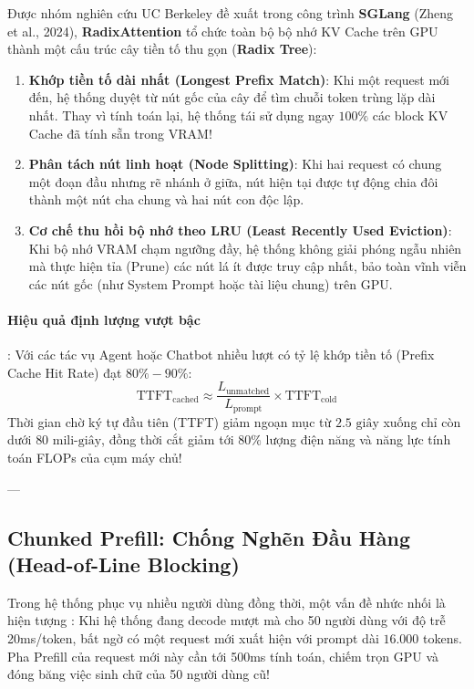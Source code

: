 Được nhóm nghiên cứu UC Berkeley đề xuất trong công trình \textbf{SGLang} (Zheng et al., 2024), \textbf{RadixAttention} tổ chức toàn bộ bộ nhớ KV Cache trên GPU thành một cấu trúc cây tiền tố thu gọn (\textbf{Radix Tree}):
\begin{enumerate}
  \item \textbf{Khớp tiền tố dài nhất (Longest Prefix Match)}: Khi một request mới đến, hệ thống duyệt từ nút gốc của cây để tìm chuỗi token trùng lặp dài nhất. Thay vì tính toán lại, hệ thống tái sử dụng ngay $100\%$ các block KV Cache đã tính sẵn trong VRAM!
  \item \textbf{Phân tách nút linh hoạt (Node Splitting)}: Khi hai request có chung một đoạn đầu nhưng rẽ nhánh ở giữa, nút hiện tại được tự động chia đôi thành một nút cha chung và hai nút con độc lập.
  \item \textbf{Cơ chế thu hồi bộ nhớ theo LRU (Least Recently Used Eviction)}: Khi bộ nhớ VRAM chạm ngưỡng đầy, hệ thống không giải phóng ngẫu nhiên mà thực hiện tỉa (Prune) các nút lá ít được truy cập nhất, bảo toàn vĩnh viễn các nút gốc (như System Prompt hoặc tài liệu chung) trên GPU.
\end{enumerate}

\paragraph{Hiệu quả định lượng vượt bậc}:
Với các tác vụ Agent hoặc Chatbot nhiều lượt có tỷ lệ khớp tiền tố (Prefix Cache Hit Rate) đạt $80\% - 90\%$:
\begin{equation}
\text{TTFT}_{\text{cached}} \approx \frac{L_{\text{unmatched}}}{L_{\text{prompt}}} \times \text{TTFT}_{\text{cold}}
\end{equation}
Thời gian chờ ký tự đầu tiên (TTFT) giảm ngoạn mục từ $2.5\text{ giây}$ xuống chỉ còn dưới \textbf{$80\text{ mili-giây}$}, đồng thời cắt giảm tới $80\%$ lượng điện năng và năng lực tính toán FLOPs của cụm máy chủ!

---

\subsection{Chunked Prefill: Chống Nghẽn Đầu Hàng (Head-of-Line Blocking)}
Trong hệ thống phục vụ nhiều người dùng đồng thời, một vấn đề nhức nhối là hiện tượng :
Khi hệ thống đang decode mượt mà cho 50 người dùng với độ trễ 20ms/token, bất ngờ có một request mới xuất hiện với prompt dài $16.000$ tokens. Pha Prefill của request mới này cần tới 500ms tính toán, chiếm trọn GPU và đóng băng việc sinh chữ của 50 người dùng cũ!

